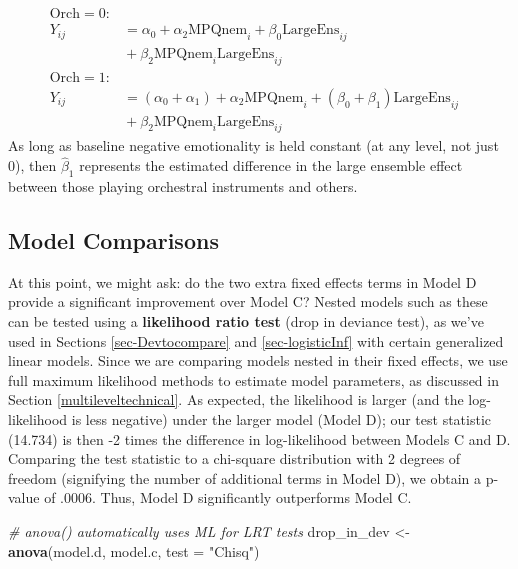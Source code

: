 \documentclass[
]{krantz}
\newenvironment{Shaded}{\begin{snugshade}}{\end{snugshade}}
\newcommand{\CommentTok}[1]{\textcolor[rgb]{0.37,0.37,0.37}{\textit{#1}}}
\newcommand{\DataTypeTok}[1]{\textcolor[rgb]{0.27,0.27,0.27}{#1}}
\newcommand{\KeywordTok}[1]{\textcolor[rgb]{0.27,0.27,0.27}{\textbf{#1}}}
\newcommand{\NormalTok}[1]{#1}
\newcommand{\StringTok}[1]{\textcolor[rgb]{0.5,0.5,0.5}{#1}}
\begin{document}
\begin{align*}
\textrm{Orch}=0: & & \\
Y_{ij} & = \alpha_{0}+\alpha_{2}\textrm{MPQnem}_{i}+\beta_{0}\textrm{LargeEns}_{ij} \\
 & \textrm{} +\beta_{2}\textrm{MPQnem}_{i}\textrm{LargeEns}_{ij} \\
\textrm{Orch}=1: & \\
Y_{ij} & = (\alpha_{0}+\alpha_{1})+\alpha_{2}\textrm{MPQnem}_{i}+(\beta_{0}+\beta_{1})\textrm{LargeEns}_{ij} \\
 & \textrm{} +\beta_{2}\textrm{MPQnem}_{i}\textrm{LargeEns}_{ij}
\end{align*}
As long as baseline negative emotionality is held constant (at any level, not just 0), then \(\hat{\beta}_{1}\) represents the estimated difference in the large ensemble effect between those playing orchestral instruments and others.

\hypertarget{compare:modeld}{%
\subsection{Model Comparisons}\label{compare:modeld}}

At this point, we might ask: do the two extra fixed effects terms in Model D provide a significant improvement over Model C? Nested models such as these can be tested using a \textbf{likelihood ratio test}  (drop in deviance test),  as we've used in Sections \ref{sec-Devtocompare} and \ref{sec-logisticInf} with certain generalized linear models. Since we are comparing models nested in their fixed effects, we use full maximum likelihood methods to estimate model parameters, as discussed in Section \ref{multileveltechnical}. As expected, the likelihood is larger (and the log-likelihood is less negative) under the larger model (Model D); our test statistic (14.734) is then -2 times the difference in log-likelihood between Models C and D. Comparing the test statistic to a chi-square distribution with 2 degrees of freedom (signifying the number of additional terms in Model D), we obtain a p-value of .0006. Thus, Model D significantly outperforms Model C.

\begin{Shaded}
\begin{Highlighting}[]
\CommentTok{# anova() automatically uses ML for LRT tests}
\NormalTok{drop_in_dev <-}\StringTok{ }\KeywordTok{anova}\NormalTok{(model.d, model.c, }\DataTypeTok{test =} \StringTok{"Chisq"}\NormalTok{)}
\end{Highlighting}
\end{Shaded}
\end{document}

